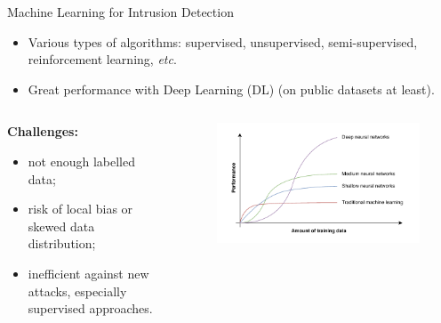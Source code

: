\begin{frame}{Machine Learning for Intrusion Detection}

  \begin{itemize}
    \item Various types of algorithms: \alert<2>{supervised}, unsupervised, semi-supervised, reinforcement learning, \textit{etc}.
    \item Great performance with Deep Learning (DL) (on public datasets at least).
  \end{itemize}

  \pause
  \begin{columns}
    \begin{column}{0.5\textwidth}
        \textbf{Challenges:}
        \begin{itemize}
          \item not enough labelled data;
          \item risk of local bias or skewed data distribution;
          \item inefficient against new attacks, especially \alert{supervised} approaches.
        \end{itemize}
    \end{column}

    \begin{column}{0.5\textwidth}
      \begin{figure}
        \centering
        \includegraphics[width=\linewidth]{figures/intro/ml-perf}
      \end{figure}
    \end{column}
  \end{columns}
\end{frame}



